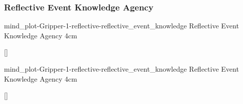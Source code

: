 {\newpage
  \noindent\begin{minipage}{\textwidth}
    \subsubsection{Reflective Event Knowledge Agency}
    \experimentcausegroupplots{\dataappendixmaxtime}
                           {\dataappendixexperimentonemaxtime}
                           {\dataappendixexperimenttwomaxtime}
                           {\dataappendixexperimentthreemaxtime}
                           {\dataappendixexperimentonename}
                           {\dataappendixexperimenttwoname}
                           {\dataappendixexperimentthreename}
                           {\dataappendixexperimentoneprettyname}
                           {\dataappendixexperimenttwoprettyname}
                           \experimentcausegroupplotscontinued{\dataappendixexperimentthreeprettyname}
                                                              {mind_plot-Gripper-1-reflective-reflective_event_knowledge}
                                                              {Reflective Event Knowledge Agency}
                                                              {\experimentdatacommontablereference}
                                                              {4cm}
    \experimentdatablocksworldexample

    []{}
  \label{figure:mind_plot-Gripper-1-reflective-reflective_event_knowledge}
  \end{minipage}

  \noindent\begin{minipage}{\textwidth}
    \experimentcausegroupplotstwo{\dataappendixmaxtime}
                           {\dataappendixexperimentonemaxtime}
                           {\dataappendixexperimenttwomaxtime}
                           {\dataappendixexperimentthreemaxtime}
                           {\dataappendixexperimentonename}
                           {\dataappendixexperimenttwoname}
                           {\dataappendixexperimentthreename}
                           {\dataappendixexperimentoneprettyname}
                           {\dataappendixexperimenttwoprettyname}
                           \experimentcausegroupplotstwocontinued{\dataappendixexperimentthreeprettyname}
                                                              {mind_plot-Gripper-1-reflective-reflective_event_knowledge}
                                                              {Reflective Event Knowledge Agency}
                                                              {\experimentdatacommontablereference}
                                                              {4cm}
    \experimentdatablocksworldexample

    []{}
  \label{figure:mind_plot-Gripper-1-reflective-reflective_event_knowledge}
  \end{minipage}
}
